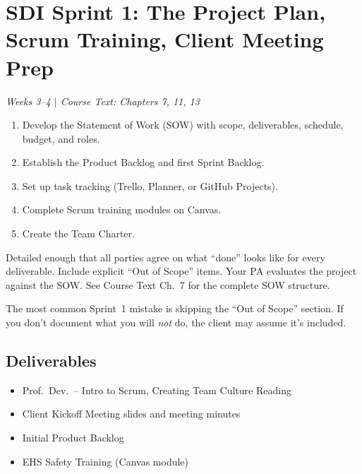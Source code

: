 \documentclass[11pt,letterpaper]{article}
\begin{document}
\section{SDI Sprint 1: The Project Plan, Scrum Training, Client Meeting Prep}
\textit{Weeks 3--4 $|$ Course Text: Chapters 7, 11, 13}

\begin{priorities}
\begin{enumerate}[nosep]
\item Develop the Statement of Work (SOW) with scope, deliverables, schedule, budget, and roles.
\item Establish the Product Backlog and first Sprint Backlog.
\item Set up task tracking (Trello, Planner, or GitHub Projects).
\item Complete Scrum training modules on Canvas.
\item Create the Team Charter.
\end{enumerate}
\end{priorities}

\begin{faqbox}
Detailed enough that all parties agree on what ``done'' looks like for every deliverable. Include explicit ``Out of Scope'' items. Your PA evaluates the project against the SOW. See Course Text Ch.~7 for the complete SOW structure.
\end{faqbox}

\begin{warnbox}
The most common Sprint~1 mistake is skipping the ``Out of Scope'' section. If you don't document what you will \emph{not} do, the client may assume it's included.
\end{warnbox}

\subsection{Deliverables}
\begin{itemize}[nosep,leftmargin=1.5em]
\item Prof.~Dev.~-- Intro to Scrum, Creating Team Culture Reading
\item Client Kickoff Meeting slides and meeting minutes
\item Initial Product Backlog
\item EHS Safety Training (Canvas module)
\end{itemize}
\end{document}
